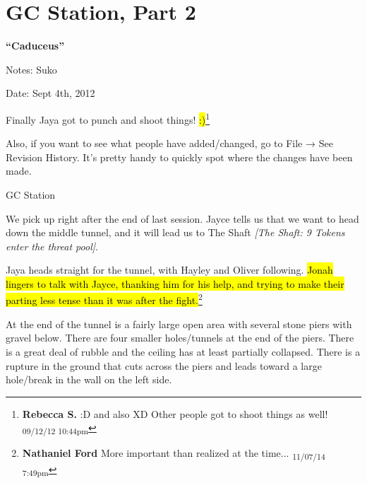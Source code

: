 \setcounter{chapter}{ 6 }
\chapter{\textbf{GC Station, Part 2} }




\begin{center}
 {\LARGE \textbf{``Caduceus''} } 
\end{center}




Notes: Suko

Date: Sept 4th, 2012



Finally Jaya got to punch and shoot things!   \hl{:)}\footnote{\textbf{Rebecca S. }:D  and also  XD  
Other people got to shoot things as well! \textsubscript{09/12/12 10:44pm}}



Also, if you want to see what people have added/changed, go to File → See Revision History.  It's pretty handy to quickly spot where the changes have been made.



\noindent\hrulefill





 {\LARGE GC Station } 



We pick up right after the end of last session.  Jayce tells us that we want to head down the middle tunnel, and it will lead us to The Shaft \textit{{[}The Shaft: 9 Tokens enter the threat pool{]}}.



Jaya heads straight for the tunnel, with Hayley and Oliver following.  \hl{Jonah lingers to talk with Jayce, thanking him for his help, and trying to make their parting less tense than it was after the fight.}\footnote{\textbf{Nathaniel Ford }More important than realized at the time... \textsubscript{11/07/14 7:49pm}}



At the end of the tunnel is a fairly large open area with several stone piers with gravel below.  There are four smaller holes/tunnels at the end of the piers.  There is a great deal of rubble and the ceiling has at least partially collapsed.  There is a rupture in the ground that cuts across the piers and leads toward a large hole/break in the wall on the left side.  




